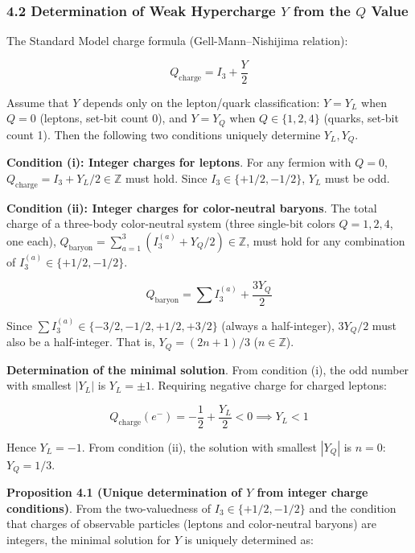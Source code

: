 \documentclass[
  a4paper,11pt]{article}
\begin{document}
\subsubsection{\texorpdfstring{4.2 Determination of Weak Hypercharge
\(Y\) from the \(Q\)
Value}{4.2 Determination of Weak Hypercharge Y from the Q Value}}\label{determination-of-weak-hypercharge-y-from-the-q-value}

The Standard Model charge formula (Gell-Mann--Nishijima relation):

\[Q_{\text{charge}} = I_3 + \frac{Y}{2}\]

Assume that \(Y\) depends only on the lepton/quark classification:
\(Y = Y_L\) when \(Q = 0\) (leptons, set-bit count 0), and \(Y = Y_Q\)
when \(Q \in \{1,2,4\}\) (quarks, set-bit count 1). Then the following
two conditions uniquely determine \(Y_L, Y_Q\).

\textbf{Condition (i): Integer charges for leptons}. For any fermion
with \(Q = 0\), \(Q_{\text{charge}} = I_3 + Y_L/2 \in \mathbb{Z}\) must
hold. Since \(I_3 \in \{+1/2, -1/2\}\), \(Y_L\) must be odd.

\textbf{Condition (ii): Integer charges for color-neutral baryons}. The
total charge of a three-body color-neutral system (three single-bit
colors \(Q = 1, 2, 4\), one each),
\(Q_{\text{baryon}} = \sum_{a=1}^{3}(I_3^{(a)} + Y_Q / 2) \in \mathbb{Z}\),
must hold for any combination of \(I_3^{(a)} \in \{+1/2, -1/2\}\).

\[Q_{\text{baryon}} = \sum I_3^{(a)} + \frac{3 Y_Q}{2}\]

Since \(\sum I_3^{(a)} \in \{-3/2, -1/2, +1/2, +3/2\}\) (always a
half-integer), \(3 Y_Q / 2\) must also be a half-integer. That is,
\(Y_Q = (2n+1)/3\) (\(n \in \mathbb{Z}\)).

\textbf{Determination of the minimal solution}. From condition (i), the
odd number with smallest \(|Y_L|\) is \(Y_L = \pm 1\). Requiring
negative charge for charged leptons:

\[Q_{\text{charge}}(e^-) = -\frac{1}{2} + \frac{Y_L}{2} < 0 \implies Y_L < 1\]

Hence \(Y_L = -1\). From condition (ii), the solution with smallest
\(|Y_Q|\) is \(n = 0\): \(Y_Q = 1/3\).

\textbf{Proposition 4.1 (Unique determination of \(Y\) from integer
charge conditions)}. From the two-valuedness of
\(I_3 \in \{+1/2, -1/2\}\) and the condition that charges of observable
particles (leptons and color-neutral baryons) are integers, the minimal
solution for \(Y\) is uniquely determined as:
\end{document}
